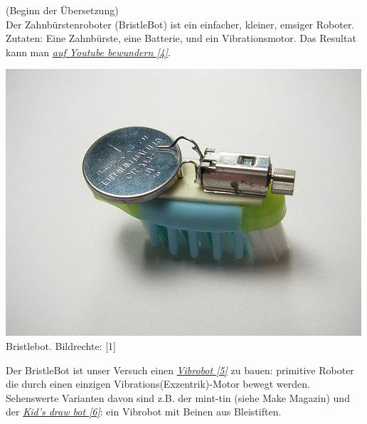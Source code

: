 \documentclass[10pt,a4paper,ngerman,twoside]{article} %
\begin{document}
\begin{multicols}{3}
(Beginn der Übersetzung) \\

Der Zahnbürstenroboter (BristleBot) ist ein einfacher, kleiner, emsiger Roboter. Zutaten: Eine Zahnbürste, eine Batterie, und ein Vibrationsmotor. Das Resultat kann man \href{http://youtu.be/rUSTXUis_ys}{\textit{auf Youtube bewundern [4]}}.

\begin{center}
\includegraphics[width=\linewidth]{bristlebot/bristlebot1.jpg}\\
\footnotesize{Bristlebot. Bildrechte: [1]}
\end{center}

Der BristleBot ist unser Versuch einen \href{http://makezine.com/projects/make-10/vibrobots/}{\textit{Vibrobot [5]}} zu bauen: primitive Roboter die durch einen einzigen Vibrations(Exzentrik)-Motor bewegt werden. Sehenswerte Varianten davon sind z.B. der mint-tin (siehe Make Magazin) und der \href{http://www.finkbuilt.com/blog/kids-art-bot/}{\textit{Kid's draw bot [6]}}: ein Vibrobot mit Beinen aus Bleistiften. \\
 

\end{multicols}
\end{document}
